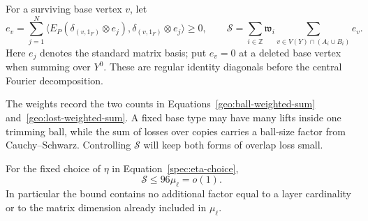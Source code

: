 For a surviving base vertex $v$, let
\begin{equation}
 e_v=\sum_{j=1}^N
  \big\langle E_P(\delta_{(v,1_F)}\otimes e_j),
                \delta_{(v,1_F)}\otimes e_j\big\rangle\geq0,
 \qquad
 \mathcal S=\sum_{i\in\mathbb Z}\mathfrak w_i
                 \sum_{v\in V(Y)\cap(A_i\cup B_i)}e_v.
 \label{spec:weighted-size}
\end{equation}
Here $e_j$ denotes the standard matrix basis; put $e_v=0$ at a deleted
base vertex when summing over $Y^0$.  These are regular identity
diagonals before the central Fourier decomposition.

The weights record the two counts in
Equations~\eqref{geo:ball-weighted-sum} and~\eqref{geo:lost-weighted-sum}.
A fixed base type may have many lifts inside one trimming ball, while
the sum of losses over copies carries a ball-size factor from
Cauchy--Schwarz. Controlling $\mathcal S$ will keep both forms of
overlap loss small.

\begin{proposition}
\label{spec:localization}
For the fixed choice of $\eta$ in Equation~\eqref{spec:eta-choice},
\begin{equation}
                \mathcal S\leq96\mu_\ell=o(1).
 \label{spec:S-small}
\end{equation}
In particular the bound contains no additional factor equal to a layer
cardinality or to the matrix dimension already included in $\mu_\ell$.
\end{proposition}

